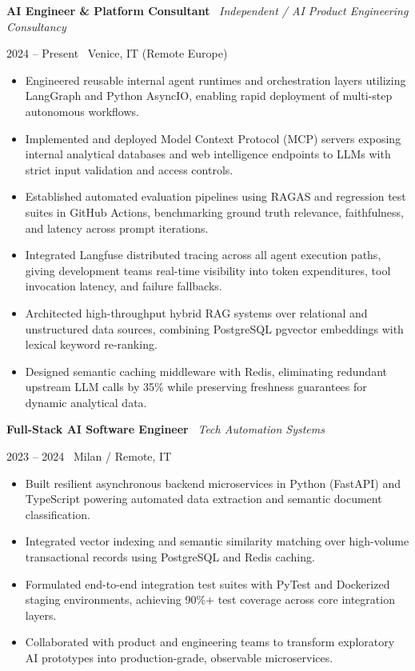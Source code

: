 \documentclass[a4paper,10pt]{article}
\newcommand{\role}[4]{%
  \vspace{2pt}\noindent
  \begin{minipage}[t]{0.70\textwidth}\raggedright\textbf{#1} \textbullet\ \textit{#3}\end{minipage}%
  \hfill
  \begin{minipage}[t]{0.28\textwidth}\raggedleft\footnotesize\color{gray}#2 \textbullet\ #4\end{minipage}%
  \vspace{1pt}%
}
\begin{document}
\role{AI Engineer \& Platform Consultant}{2024 -- Present}{Independent / AI Product Engineering Consultancy}{Venice, IT (Remote Europe)}
\begin{itemize}
  \item Engineered reusable internal agent runtimes and orchestration layers utilizing LangGraph and Python AsyncIO, enabling rapid deployment of multi-step autonomous workflows.
  \item Implemented and deployed Model Context Protocol (MCP) servers exposing internal analytical databases and web intelligence endpoints to LLMs with strict input validation and access controls.
  \item Established automated evaluation pipelines using RAGAS and regression test suites in GitHub Actions, benchmarking ground truth relevance, faithfulness, and latency across prompt iterations.
  \item Integrated Langfuse distributed tracing across all agent execution paths, giving development teams real-time visibility into token expenditures, tool invocation latency, and failure fallbacks.
  \item Architected high-throughput hybrid RAG systems over relational and unstructured data sources, combining PostgreSQL pgvector embeddings with lexical keyword re-ranking.
  \item Designed semantic caching middleware with Redis, eliminating redundant upstream LLM calls by 35\% while preserving freshness guarantees for dynamic analytical data.
\end{itemize}

\vspace{3pt}
\role{Full-Stack AI Software Engineer}{2023 -- 2024}{Tech Automation Systems}{Milan / Remote, IT}
\begin{itemize}
  \item Built resilient asynchronous backend microservices in Python (FastAPI) and TypeScript powering automated data extraction and semantic document classification.
  \item Integrated vector indexing and semantic similarity matching over high-volume transactional records using PostgreSQL and Redis caching.
  \item Formulated end-to-end integration test suites with PyTest and Dockerized staging environments, achieving 90\%+ test coverage across core integration layers.
  \item Collaborated with product and engineering teams to transform exploratory AI prototypes into production-grade, observable microservices.
\end{itemize}
\end{document}
